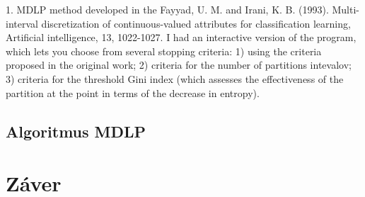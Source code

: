 1. MDLP method developed in the
Fayyad, U. M. and Irani, K. B. (1993). Multi-interval discretization of continuous-valued attributes for classification learning, Artificial intelligence, 13, 1022-1027.
I had an interactive version of the program, which lets you choose from several stopping criteria:
1) using the criteria proposed in the original work;
2) criteria for the number of partitions intevalov;
3) criteria for the threshold Gini index (which assesses the effectiveness of the partition at the point in terms of the decrease in entropy).

\subsection{Algoritmus MDLP}

\section{Záver}